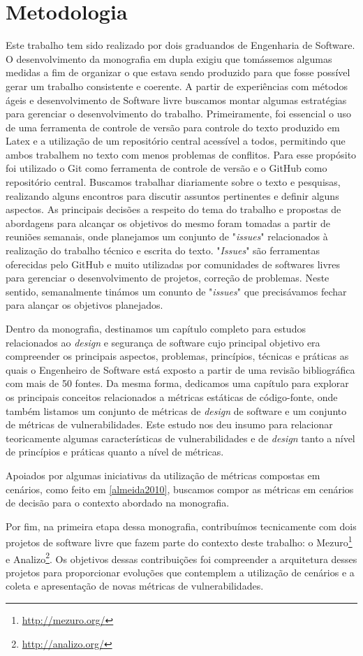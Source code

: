 \section{Metodologia}
\label{sec:methodology}

Este trabalho tem sido realizado por dois graduandos de Engenharia de Software.
%
O desenvolvimento da monografia em dupla exigiu que tomássemos algumas medidas a fim de organizar o que estava sendo produzido para que fosse possível gerar um trabalho consistente e coerente. A partir de experiências com métodos ágeis e desenvolvimento de Software livre buscamos montar algumas estratégias para gerenciar o desenvolvimento do trabalho. Primeiramente, foi essencial o uso de uma ferramenta de controle de versão para controle do texto produzido em Latex e a utilização de um repositório central acessível a todos, permitindo que ambos trabalhem no texto com menos problemas de conflitos. Para esse propósito foi utilizado o Git como ferramenta de controle de versão e o GitHub como repositório central. Buscamos trabalhar diariamente sobre o texto e pesquisas, realizando alguns encontros para discutir assuntos pertinentes e definir alguns aspectos. As principais decisões a respeito do tema do trabalho e propostas de abordagens para alcançar os objetivos do mesmo foram tomadas a partir de reuniões semanais, onde planejamos um conjunto de "\emph{issues}" relacionados à realização do trabalho técnico e escrita do texto. "\emph{Issues}" são ferramentas oferecidas pelo GitHub e muito utilizadas por comunidades de softwares livres para gerenciar o desenvolvimento de projetos, correção de problemas. Neste sentido, semanalmente tinámos um conunto de "\emph{issues}" que precisávamos fechar para alançar os objetivos planejados.

Dentro da monografia, destinamos um capítulo completo para estudos relacionados ao \emph{design} e segurança de software cujo principal objetivo era compreender os principais aspectos, problemas, princípios, técnicas e práticas as quais o Engenheiro de Software está exposto a partir de uma revisão bibliográfica com mais de 50 fontes. Da mesma forma, dedicamos uma capítulo para explorar os principais conceitos relacionados a métricas estáticas de código-fonte, onde também listamos um conjunto de métricas de \emph{design} de software e um conjunto de métricas de vulnerabilidades. Este estudo nos deu insumo para relacionar teoricamente algumas características de vulnerabilidades e de \emph{design} tanto a nível de princípios e práticas quanto a nível de métricas.

Apoiados por algumas iniciativas da utilização de métricas compostas em cenários, como feito em \ref{almeida2010}, buscamos compor as métricas em cenários de decisão para o contexto abordado na monografia.

Por fim, na primeira etapa dessa monografia, contribuímos tecnicamente com dois projetos de software livre que fazem parte do contexto deste trabalho: o Mezuro\footnote{\url{http://mezuro.org/}} e Analizo\footnote{\url{http://analizo.org/}}. Os objetivos dessas contribuições foi compreender a arquitetura desses projetos para proporcionar evoluções que contemplem a utilização de cenários e a coleta e apresentação de novas métricas de vulnerabilidades.

   
